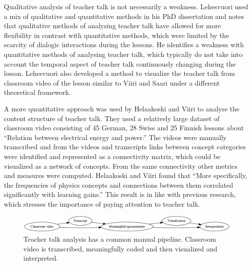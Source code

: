 \documentclass[utf8,english]{gradu3}
\begin{document}
Qualitative analysis of teacher talk is not necessarily a weakness. Lehesvuori \parencite*{lehesvuoriDialogicTeachingScience2013} used a mix of qualitative and quantitative methods in his PhD dissertation and notes that qualitative methods of analysing teacher talk have allowed for more flexibility in contrast with quantitative methods, which were limited by the scarcity of dialogic interactions during the lessons. He identifies a weakness with quantitative methods of analysing teacher talk, which typically do not take into account the temporal aspect of teacher talk continuously changing during the lesson. Lehesvuori \parencite*{lehesvuoriVisualizingCommunicationStructures2013} also developed a method to visualize the teacher talk from classroom video of the lesson similar to Viiri and Saari \parencite*{viiriTeacherTalkPatterns2006} under a different theoretical framework.

A more quantitative approach was used by Helaakoski and Viiri \parencite{helaakoskiContentContentStructure2014} to analyse the content structure of teacher talk. They used a relatively large dataset of classroom video consisting of 45 German, 28 Swiss and 25 Finnish lessons about \enquote{Relation  between  electrical  energy  and  power.} The videos were manually transcribed and from the videos and transcripts links between concept categories were identified and represented as a connectivity matrix, which could be visualized as a network of concepts. From the same connectivity other metrics and measures were computed. Helaakoski and Viiri \parencite*{helaakoskiContentContentStructure2014} found that \enquote{More  specifically,  the  frequencies  of  physics  concepts  and  connections  between  them  correlated  significantly  with  learning  gains.} This result is in like with previous research, which stresses the importance of paying attention to teacher talk. \parencite{viiriTeacherTalkPatterns2006,scottTeachingScienceMeaningful2007,scottPedagogicalLinkMaking2011}

\begin{figure}
  \includegraphics[width=\linewidth]{../figures/teacher_talk_manual_pipeline.png}
  \caption{Teacher talk analysis has a common manual pipeline. Classroom video is transcribed, meaningfully coded and then visualized and interpreted.}
  \label{fig:manualpipeline}
\end{figure}
\end{document}
